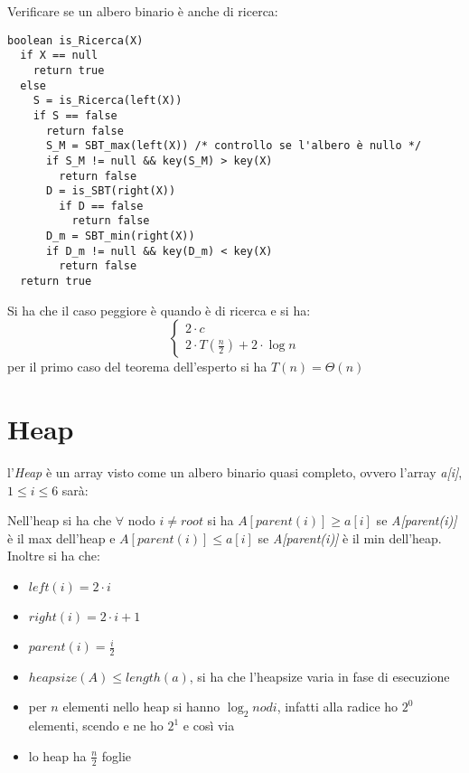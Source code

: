 \documentclass[a4paper,12pt,oneside,tikz]{book}
\begin{document}
\begin{esercizio}
	Verificare se un albero binario è anche di ricerca:
	\begin{verbatim}
boolean is_Ricerca(X)
  if X == null
    return true
  else
    S = is_Ricerca(left(X))
    if S == false
      return false
      S_M = SBT_max(left(X)) /* controllo se l'albero è nullo */
      if S_M != null && key(S_M) > key(X)
        return false
      D = is_SBT(right(X))
        if D == false
          return false
      D_m = SBT_min(right(X))
      if D_m != null && key(D_m) < key(X)
        return false
  return true
\end{verbatim}
	Si ha che il caso peggiore è quando è di ricerca e si ha:
	$$\begin{cases}
			2\cdot c \\
			2\cdot T\left(\frac{n}{2}\right)+2\cdot\log n
		\end{cases}$$
	per il primo caso del teorema dell'esperto si ha $T(n)=\Theta(n)$
\end{esercizio}
\section{Heap}
l'\textit{Heap} è un array visto come un albero binario quasi completo, ovvero l'array \textit{a[i]}, $1\leq i\leq 6$ sarà:
\begin{center}
\end{center}
Nell'heap si ha che $\forall$ nodo $i\neq root$ si ha $A[parent(i)]\geq a[i]$ se \textit{A[parent(i)]} è il max dell'heap e $A[parent(i)]\leq a[i]$ se \textit{A[parent(i)]} è il min dell'heap.\\Inoltre si ha che:
\begin{itemize}
	\item $left(i)=2\cdot i$
	\item $right(i)=2\cdot i+1$
	\item $parent(i)=\frac{i}{2}$
	\item $heapsize(A)\leq length(a)$, si ha che l'heapsize varia in fase di esecuzione
	\item per $n$ elementi nello heap si hanno $\log_2 nodi$, infatti alla radice ho $2^0$ elementi, scendo e ne ho $2^1$ e così via
	\item lo heap ha $\frac{n}{2}$ foglie
\end{itemize}
\newpage
\end{document}
